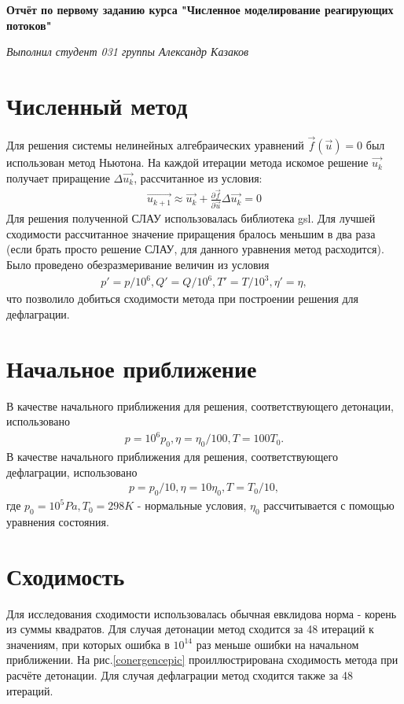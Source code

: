 \documentclass[12pt]{article}
\begin{document}
{\Large\textbf {Отчёт по первому заданию курса "Численное моделирование реагирующих потоков"}\par}
\textit{Выполнил студент 031 группы Александр Казаков}

\section{Численный метод}
Для решения системы нелинейных алгебраических уравнений  $\vec{f}(\vec{u}) = 0$ был использован метод Ньютона. 
На каждой итерации метода искомое решение $\vec{u_k}$ получает приращение $\Delta\vec{u_k}$, рассчитанное из условия:
\begin{eqnarray}
\vec{u_{k+1}} \approx \vec{u_k} + \frac{\partial{\vec{f}}}{\partial{\vec{u}}}\Delta\vec{u_k} = 0
\end{eqnarray}
Для решения полученной СЛАУ использовалась библиотека gsl.
Для лучшей сходимости рассчитанное значение приращения бралось меньшим в два раза (если брать просто решение СЛАУ, 
для данного уравнения метод расходится). 
Было проведено обезразмеривание величин из условия 
\begin{eqnarray}
p' = p/10^6, Q' = Q/10^6, T' = T/10^3, \eta' = \eta,
\end{eqnarray}
что позволило добиться сходимости метода при построении решения для дефлаграции.

\section{Начальное приближение}\label{initAppr}
В качестве начального приближения для решения, соответствующего детонации, использовано
\begin{eqnarray}
p = 10^6p_0, \eta = \eta_0/100, T = 100T_0. 
\end{eqnarray}
В качестве начального приближения для решения, соответствующего дефлаграции, использовано
\begin{eqnarray}
p = p_0/10, \eta = 10\eta_0, T = T_0/10,
\end{eqnarray}
где $p_0 = 10^5Pa, T_0 = 298K$ - нормальные условия, $\eta_0$ рассчитывается с помощью уравнения состояния.

\section{Сходимость}\label{converg}
Для исследования сходимости использовалась обычная евклидова норма - корень из суммы квадратов.
Для случая детонации метод сходится за 48 итераций к значениям, при которых ошибка в $10^{14}$ раз меньше ошибки на начальном приближении.
На рис.\ref{conergencepic} проиллюстрирована сходимость метода при расчёте детонации.
Для случая дефлаграции метод сходится также за 48 итераций.
\end{document}

